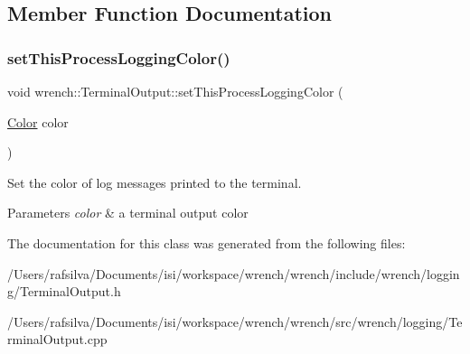 \subsection{Member Function Documentation}
\mbox{\label{classwrench_1_1_terminal_output_a07c9d9aaefaf7d79fc2cafaa92162813}} 
\subsubsection{\texorpdfstring{set\+This\+Process\+Logging\+Color()}{setThisProcessLoggingColor()}}
{\footnotesize\ttfamily void wrench\+::\+Terminal\+Output\+::set\+This\+Process\+Logging\+Color (\begin{DoxyParamCaption}\item[{\hyperlink{classwrench_1_1_terminal_output_a793daa5c24c3613b398f801a75bfa1e0}{Color}}]{color }\end{DoxyParamCaption})\hspace{0.3cm}{\ttfamily [static]}}



Set the color of log messages printed to the terminal. 


\begin{DoxyParams}{Parameters}
{\em color} & a terminal output color \\
\hline
\end{DoxyParams}


The documentation for this class was generated from the following files\+:\begin{DoxyCompactItemize}
\item 
/\+Users/rafsilva/\+Documents/isi/workspace/wrench/wrench/include/wrench/logging/Terminal\+Output.\+h\item 
/\+Users/rafsilva/\+Documents/isi/workspace/wrench/wrench/src/wrench/logging/Terminal\+Output.\+cpp\end{DoxyCompactItemize}
